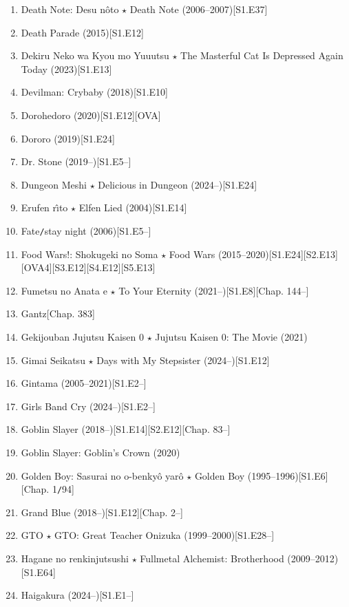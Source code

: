 \documentclass{article}
\begin{document}
\begin{enumerate}
    \item {\sc Death Note: Desu n\^oto $\star$ Death Note} (2006--2007)\hfill[S1.E37]
    \item {\sc Death Parade} (2015)\hfill[S1.E12]
    \item {\sc Dekiru Neko wa Kyou mo Yuuutsu $\star$ The Masterful Cat Is Depressed Again Today} (2023)\hfill[S1.E13]
    \item {\sc Devilman: Crybaby} (2018)\hfill[S1.E10]
    \item {\sc Dorohedoro} (2020)\hfill[S1.E12][OVA]
    \item {\sc Dororo} (2019)\hfill[S1.E24]
    \item Dr. Stone (2019--)\hfill[S1.E5--]
    \item {\sc Dungeon Meshi $\star$ Delicious in Dungeon} (2024--)\hfill[S1.E24]
    \item {\sc Erufen r\^{\i}to $\star$ Elfen Lied} (2004)\hfill[S1.E14]
    \item Fate{\tt/}stay night (2006)\hfill[S1.E5--]
    \item {\sc Food Wars!: Shokugeki no Soma $\star$ Food Wars} (2015--2020)\hfill[S1.E24][S2.E13][OVA4][S3.E12][S4.E12][S5.E13]
    \item Fumetsu no Anata e $\star$ To Your Eternity (2021--)\hfill[S1.E8][Chap. 144--]
    \item {\sc Gantz}\hfill[Chap. 383]
    \item {\sc Gekijouban Jujutsu Kaisen 0 $\star$ Jujutsu Kaisen 0: The Movie} (2021)
    \item {\sc Gimai Seikatsu $\star$ Days with My Stepsister} (2024--)\hfill[S1.E12]
    \item Gintama (2005--2021)\hfill[S1.E2--]
    \item Girls Band Cry (2024--)\hfill[S1.E2--]
    \item {\sc Goblin Slayer} (2018--)\hfill[S1.E14][S2.E12][Chap. 83--]
    \item {\sc Goblin Slayer: Goblin's Crown} (2020)
    \item {\sc Golden Boy: Sasurai no o-benky\^o yar\^o $\star$ Golden Boy} (1995--1996)\hfill[S1.E6][Chap. 1{\tt/}94]
    \item Grand Blue (2018--)\hfill[S1.E12][Chap. 2--]
    \item GTO $\star$ GTO: Great Teacher Onizuka (1999--2000)\hfill[S1.E28--]
    \item {\sc Hagane no renkinjutsushi $\star$ Fullmetal Alchemist: Brotherhood} (2009--2012)\hfill[S1.E64]
    \item Haigakura (2024--)\hfill[S1.E1--]

\end{enumerate}
\end{document}

